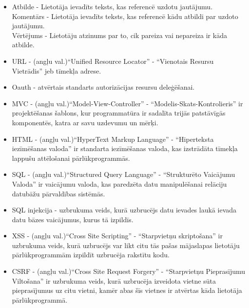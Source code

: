\documentclass[12pt]{article}
\begin{document}
\begin{itemize}
\setlength{\itemsep}{0em}
\item Atbilde - Lietotāja ievadīts teksts, kas referencē uzdotu jautājumu.\\
Komentārs - Lietotāja ievadīts teksts, kas referencē kādu atbildi par uzdoto jautājumu.\\
Vērtējums - Lietotāju atzinums par to, cik pareiza vai nepareiza ir kāda atbilde.\\
\item URL - (angļu val.)``Unified Resource Locator'' - ``Vienotais Resursu Vietrādis'' jeb tīmekļa adrese.\cite{URL}\\
\item Oauth - atvērtais standarts autorizācijas resursu deleģēšanai.\cite{Oauth}\\
\item MVC - (angļu val.)``Model-View-Controller'' - ``Modelis-Skats-Kontrolieris'' ir projektēšanas šablons, kur programmatūra ir sadalīta trijās patstāvīgās komponentēs, katra ar savu uzdevumu un mērķi.\cite{C2}\\
\item HTML - (angļu val.)``HyperText Markup Language'' - ``Hiperteksta iezīmēšanas valoda'' ir standarta iezīmēšanas valoda, kas izstrādāta tīmekļa lappušu attēlošanai pārlūkprogrammās.\cite{HTML}\\
\item SQL - (angļu val.)``Structured Query Language'' - ``Strukturēto Vaicājumu Valoda'' ir vaicājumu valoda, kas paredzēta datu manipulēšanai relāciju datubāžu pārvaldības sistēmās.\cite{SQL}\\
\item SQL injekcija - uzbrukuma veids, kurā uzbrucējs datu ievades laukā ievada datu bāzes vaicājumus, kurus tā izpildīs.\cite{injection}\\
\item XSS - (angļu val.)``Cross Site Scripting'' - ``Starpvietņu skriptošana'' ir uzbrukuma veids, kurā uzbrucējs var likt citu tās pašas mājaslapas lietotāju pārlūkprogrammām izpildīt uzbrucēja rakstītu kodu.\cite{XSS}\\
\item CSRF - (angļu val.)``Cross Site Request Forgery'' - ``Starpvietņu Pieprasījumu Viltošana'' ir uzbrukuma veids, kurā uzbrucēja izveidota vietne sūta pieprasījumus uz citu vietni, kamēr abas šīs vietnes ir atvērtas kāda lietotāja pārlūkprogrammā.\cite{CSRF}\\
\end{itemize}
\end{document}
